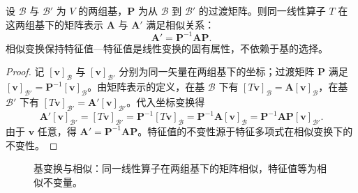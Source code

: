 \begin{proposition}[基变换与相似]\label{prop:change_of_basis}
设 $\mathcal{B}$ 与 $\mathcal{B}'$ 为 $V$ 的两组基，$\mathbf{P}$ 为从 $\mathcal{B}$ 到 $\mathcal{B}'$ 的过渡矩阵。则同一线性算子 $T$ 在这两组基下的矩阵表示 $\mathbf{A}$ 与 $\mathbf{A}'$ 满足相似关系：
\[
\mathbf{A}' = \mathbf{P}^{-1} \mathbf{A} \mathbf{P}.
\]
相似变换保持特征值---特征值是线性变换的固有属性，不依赖于基的选择。
\end{proposition}

\begin{proof}
记 $[\mathbf{v}]_{\mathcal{B}}$ 与 $[\mathbf{v}]_{\mathcal{B}'}$ 分别为同一矢量在两组基下的坐标；过渡矩阵 $\mathbf{P}$ 满足 $[\mathbf{v}]_{\mathcal{B}'} = \mathbf{P}^{-1}[\mathbf{v}]_{\mathcal{B}}$。由矩阵表示的定义，在基 $\mathcal{B}$ 下有 $[T\mathbf{v}]_{\mathcal{B}} = \mathbf{A}[\mathbf{v}]_{\mathcal{B}}$，在基 $\mathcal{B}'$ 下有 $[T\mathbf{v}]_{\mathcal{B}'} = \mathbf{A}'[\mathbf{v}]_{\mathcal{B}'}$。代入坐标变换得
\[
\mathbf{A}'[\mathbf{v}]_{\mathcal{B}'} = [T\mathbf{v}]_{\mathcal{B}'} = \mathbf{P}^{-1}[T\mathbf{v}]_{\mathcal{B}} = \mathbf{P}^{-1}\mathbf{A}[\mathbf{v}]_{\mathcal{B}} = \mathbf{P}^{-1}\mathbf{A}\mathbf{P}[\mathbf{v}]_{\mathcal{B}'}.
\]
由于 $\mathbf{v}$ 任意，得 $\mathbf{A}' = \mathbf{P}^{-1}\mathbf{A}\mathbf{P}$。特征值的不变性源于特征多项式在相似变换下的不变性。
\end{proof}

\begin{figure}[htbp]
\centering
{}
\caption{基变换与相似：同一线性算子在两组基下的矩阵相似，特征值等为相似不变量。}
\label{fig:change_of_basis}
\end{figure}

